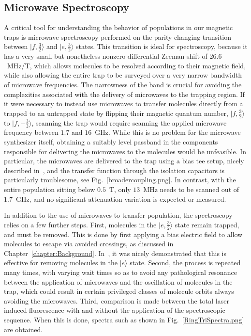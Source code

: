 \documentclass[defaultstyle,11pt]{thesis}
\begin{document}
\subsection{Microwave Spectroscopy}

A critical tool for understanding the behavior of populations in our magnetic traps is microwave spectroscopy performed on the parity changing transition between $|f, \frac{3}{2}\rangle$ and $|e, \frac{3}{2}\rangle$ states.
This transition is ideal for spectroscopy, because it has a very small but nonetheless nonzero differential Zeeman shift of $26.6$~MHz/T, which allows molecules to be resolved according to their magnetic field, while also allowing the entire trap to be surveyed over a very narrow bandwidth of microwave frequencies.
The narrowness of the band is crucial for avoiding the complexities associated with the delivery of microwaves to the trapping region.
If it were necessary to instead use microwaves to transfer molecules directly from a trapped to an untrapped state by flipping their magnetic quantum number, $|f, \frac{3}{2}\rangle$ to $|f, -\frac{3}{2}\rangle$, scanning the trap would require scanning the applied microwave frequency between $1.7$ and $16$~GHz.
While this is no problem for the microwave synthesizer itself, obtaining a suitably level passband in the components responsible for delivering the microwaves to the molecules would be unfeasible.
In particular, the microwaves are delivered to the trap using a bias tee setup, nicely described in~\citep[Fig.~5]{stuhl2012uwave}, and the transfer function through the isolation capacitors is particularly troublesome, see Fig.~\ref{broadercoupling.png}.
In contrast, with the entire population sitting below $0.5$~T, only $13$~MHz needs to be scanned out of $1.7$~GHz, and no significant attenuation variation is expected or measured.


In addition to the use of microwaves to transfer population, the spectroscopy relies on a few further steps.
First, molecules in the $|e, \frac{3}{2}\rangle$ state remain trapped, and must be removed.
This is done by first applying a bias electric field to allow molecules to escape via avoided crossings, as discussed in Chapter~\ref{chapter:Background}.
In~\cite{stuhl2012uwave}, it was nicely demonstrated that this is effective for removing molecules in the $|e\rangle$ state.
Second, the process is repeated many times, with varying wait times so as to avoid any pathological resonance between the application of microwaves and the oscillation of molecules in the trap, which could result in certain privileged classes of molecule orbits always avoiding the microwaves.
Third, comparison is made between the total laser induced fluorescence with and without the application of the spectroscopic sequence.
When this is done, spectra such as shown in Fig.~\ref{RingTriSpectra.png} are obtained.
\end{document}
